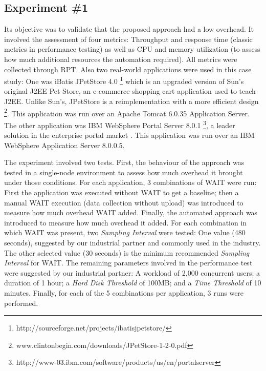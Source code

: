 \documentclass[runningheads,a4paper]{llncs}
\begin{document}
\subsection{Experiment \#1}

Its objective was to validate that the proposed approach had a low overhead.
It involved the assessment of four metrics: Throughput and response time
(classic metrics in performance testing) as well as CPU and memory utilization
(to assess how much additional resources the automation required). All metrics
were collected through RPT. Also two real-world applications were used in this
case study: One was iBatis JPetStore 4.0
\footnote{http://sourceforge.net/projects/ibatisjpetstore/} which is an upgraded
version of Sun's original J2EE Pet Store, an e-commerce shopping cart
application used to teach J2EE. Unlike Sun’s, JPetStore is a reimplementation
with a more efficient design
\footnote{www.clintonbegin.com/downloads/JPetStore-1-2-0.pdf‎}. This application
was run over an Apache Tomcat 6.0.35 Application Server.
The other application was IBM WebSphere Portal Server 8.0.1 \footnote{http://www-03.ibm.com/software/products/us/en/portalserver},
a leader solution in the enterprise portal market \cite{Gartner2008}. This
application was run over an IBM WebSphere Application Server 8.0.0.5.

The experiment involved two tests. First, the behaviour of
the approach was tested in a single-node environment to assess how much
overhead it brought under those conditions. For each application, 3 combinations
of WAIT were run: First the application was executed without WAIT to get a
baseline; then a manual WAIT execution (data collection without upload) was
introduced to measure how much overhead WAIT added. Finally, the automated
approach was introduced to measure how much overhead it added. For each
combination in which WAIT was present, two \emph{Sampling Interval} were tested:
One value (480 seconds), suggested by our industrial partner and commonly
used in the industry. The other selected value (30 seconds) is the minimum
recommended \emph{Sampling Interval} for WAIT. The remaining parameters involved
in the performance test were suggested by our industrial partner: A workload of
2,000 concurrent users; a duration of 1 hour; a \emph{Hard Disk Threshold} of
100MB; and a \emph{Time Threshold} of 10 minutes. Finally, for each of the 5
combinations per application, 3 runs were performed.
\end{document}
